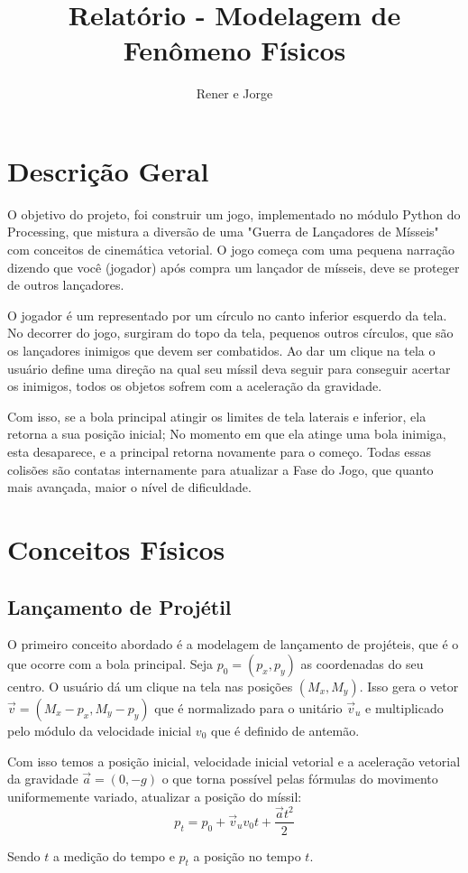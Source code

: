\documentclass[12pt,letterpaper]{article}
\title{Relatório - Modelagem de Fenômeno Físicos}
\author{Rener e Jorge}
\begin{document}
\maketitle

\section*{Descrição Geral}

O objetivo do projeto, foi construir um jogo, implementado no módulo Python do Processing, que mistura a diversão de uma "Guerra de Lançadores de Mísseis" com conceitos de cinemática vetorial. O jogo começa com uma pequena narração dizendo que você (jogador) após compra um lançador de mísseis, deve se proteger de outros lançadores.

O jogador é um representado por um círculo no canto inferior esquerdo da tela. No decorrer do jogo, surgiram do topo da tela, pequenos outros círculos, que são os lançadores inimigos que devem ser combatidos. Ao dar um clique na tela o usuário define uma direção na qual seu míssil deva seguir para conseguir acertar os inimigos, todos os objetos sofrem com a aceleração da gravidade. 

Com isso, se a bola principal atingir os limites de tela laterais e inferior, ela retorna a sua posição inicial; No momento em que ela atinge uma bola inimiga, esta desaparece, e a principal retorna novamente para o começo. Todas essas colisões são contatas internamente para atualizar a Fase do Jogo, que quanto mais avançada, maior o nível de dificuldade.

\section*{Conceitos Físicos}
\subsection*{Lançamento de Projétil}
O primeiro conceito abordado é a modelagem de lançamento de projéteis, que é o que ocorre com a bola principal. Seja $p_0=(p_x,p_y)$ as coordenadas do seu centro. O usuário dá um clique na tela nas posições $(M_x,M_y)$. Isso gera o vetor $\vec{v}=(M_x-p_x,M_y-p_y)$ que é normalizado para o unitário $\vec{v}_u$ e multiplicado pelo módulo da velocidade inicial $v_0$ que é definido de antemão.

Com isso temos a posição inicial, velocidade inicial vetorial e a aceleração vetorial da gravidade $\vec{a}=(0,-g)$ o que torna possível pelas fórmulas do movimento uniformemente variado, atualizar a posição do míssil:
$$p_t=p_0+\vec{v}_u v_0 t+\displaystyle\frac{\vec{a}t^2}{2}$$

Sendo $t$ a medição do tempo e $p_t$ a posição no tempo $t$.
\end{document}
